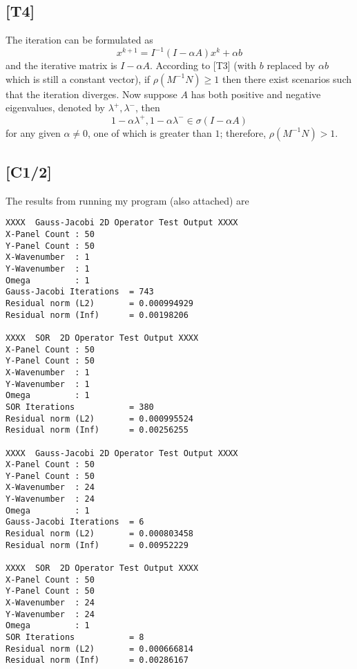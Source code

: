 \documentclass[12pt,a4paper]{article}
\begin{document}
\subsection*{[T4]} The iteration can be formulated as 
$$x^{k+1} = I^{-1}(I - \alpha A)x^k + \alpha b$$
and the iterative matrix is $I - \alpha A$. According to [T3] (with $b$ replaced by $\alpha b$ which is still a constant vector), if $\rho(M^{-1}N) \geq 1$ then there exist scenarios such that the iteration diverges. Now suppose $A$ has both positive and negative eigenvalues, denoted by $\lambda^+, \lambda^-$, then
$$1 - \alpha \lambda^+, 1-\alpha \lambda^- \in \sigma(I - \alpha A)$$
for any given $\alpha \neq 0$, one of which is greater than $1$; therefore, $\rho(M^{-1}N) > 1$. 
\newpage\subsection*{[C1/2]}
The results from running my program (also attached) are 
\begin{verbatim}
XXXX  Gauss-Jacobi 2D Operator Test Output XXXX 
X-Panel Count : 50
Y-Panel Count : 50
X-Wavenumber  : 1
Y-Wavenumber  : 1
Omega         : 1
Gauss-Jacobi Iterations  = 743
Residual norm (L2)       = 0.000994929
Residual norm (Inf)      = 0.00198206

XXXX  SOR  2D Operator Test Output XXXX 
X-Panel Count : 50
Y-Panel Count : 50
X-Wavenumber  : 1
Y-Wavenumber  : 1
Omega         : 1
SOR Iterations           = 380
Residual norm (L2)       = 0.000995524
Residual norm (Inf)      = 0.00256255

XXXX  Gauss-Jacobi 2D Operator Test Output XXXX 
X-Panel Count : 50
Y-Panel Count : 50
X-Wavenumber  : 24
Y-Wavenumber  : 24
Omega         : 1
Gauss-Jacobi Iterations  = 6
Residual norm (L2)       = 0.000803458
Residual norm (Inf)      = 0.00952229

XXXX  SOR  2D Operator Test Output XXXX 
X-Panel Count : 50
Y-Panel Count : 50
X-Wavenumber  : 24
Y-Wavenumber  : 24
Omega         : 1
SOR Iterations           = 8
Residual norm (L2)       = 0.000666814
Residual norm (Inf)      = 0.00286167
\end{verbatim}
\end{document}
